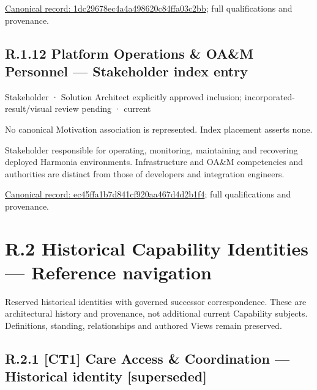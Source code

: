 {\footnotesize \href{../../../../continuum/motivation/stakeholder/1dc29678ec4a4a498620c84ffa03c2bb.md}{Canonical record: 1dc29678ec4a4a498620c84ffa03c2bb}; full qualifications and provenance.}\par
\section*{R.1.12 Platform Operations \& OA\&M Personnel — Stakeholder index entry}
\label{navigation:R.1.12}

\label{element:ec45ffa1b7d841cf920aa467d4d2b1f4}
{\small Stakeholder · Solution Architect explicitly approved inclusion; incorporated-result/visual review pending · current}\par
No canonical Motivation association is represented. Index placement asserts none.\par

Stakeholder responsible for operating, monitoring, maintaining and recovering deployed Harmonia environments. Infrastructure and OA\&M competencies and authorities are distinct from those of developers and integration engineers.


{\footnotesize \href{../../../../continuum/motivation/stakeholder/ec45ffa1b7d841cf920aa467d4d2b1f4.md}{Canonical record: ec45ffa1b7d841cf920aa467d4d2b1f4}; full qualifications and provenance.}\par
\chapter*{R.2 Historical Capability Identities — Reference navigation}
\label{navigation:R.2}

Reserved historical identities with governed successor correspondence. These are architectural history and provenance, not additional current Capability subjects. Definitions, standing, relationships and authored Views remain preserved.\par
\section*{R.2.1 [CT1] Care Access \& Coordination — Historical identity [superseded]}
\label{navigation:R.2.1}

